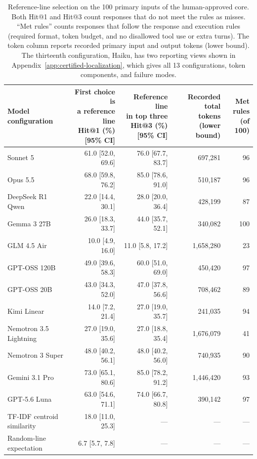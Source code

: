 \begin{table}[htbp]
\centering\footnotesize
\setlength{\tabcolsep}{2.5pt}
\begin{tabular}{@{}lrrrr@{}}
\toprule
Model configuration & \shortstack{First choice is\\a reference line\\Hit@1 (\%) [95\% CI]} & \shortstack{Reference line\\in top three\\Hit@3 (\%) [95\% CI]} & \shortstack{Recorded total\\tokens (lower bound)} & \shortstack{Met rules\\(of 100)}\\
\midrule
Sonnet 5 & 61.0 [52.0, 69.6] & 76.0 [67.7, 83.7] & 697,281 & 96 \\
Opus 5.5 & 68.0 [59.8, 76.2] & 85.0 [78.6, 91.0] & 510,187 & 96 \\
DeepSeek R1 Qwen & 22.0 [14.4, 30.1] & 28.0 [20.0, 36.4] & 428,199 & 87 \\
Gemma 3 27B & 26.0 [18.3, 33.7] & 44.0 [35.7, 52.1] & 340,082 & 100 \\
GLM 4.5 Air & 10.0 [4.9, 16.0] & 11.0 [5.8, 17.2] & 1,658,280 & 23 \\
GPT-OSS 120B & 49.0 [39.6, 58.3] & 60.0 [51.0, 69.0] & 450,420 & 97 \\
GPT-OSS 20B & 43.0 [34.3, 52.0] & 47.0 [37.8, 56.6] & 708,462 & 89 \\
Kimi Linear & 14.0 [7.2, 21.4] & 27.0 [19.0, 35.7] & 241,035 & 94 \\
Nemotron 3.5 Lightning & 27.0 [19.0, 35.6] & 27.0 [18.8, 35.4] & 1,676,079 & 41 \\
Nemotron 3 Super & 48.0 [40.2, 56.1] & 48.0 [40.2, 56.0] & 740,935 & 90 \\
Gemini 3.1 Pro & 73.0 [65.1, 80.6] & 85.0 [78.2, 91.2] & 1,446,420 & 93 \\
GPT-5.6 Luna & 63.0 [54.6, 71.1] & 74.0 [66.7, 80.8] & 390,142 & 97 \\
\midrule
TF-IDF centroid similarity & 18.0 [11.0, 25.3] & --- & --- & ---\\
Random-line expectation & 6.7 [5.7, 7.8] & --- & --- & ---\\
\bottomrule
\end{tabular}
\caption{Reference-line selection on the 100 primary inputs of the human-approved core. Both Hit@1 and Hit@3 count responses that do not meet the rules as misses. ``Met rules'' counts responses that follow the response and execution rules (required format, token budget, and no disallowed tool use or extra turns). The token column reports recorded primary input and output tokens (lower bound). The thirteenth configuration, Haiku, has two reporting views shown in Appendix~\ref{app:certified-localization}, which gives all 13 configurations, token components, and failure modes.}
\label{tab:localization}
\end{table}
